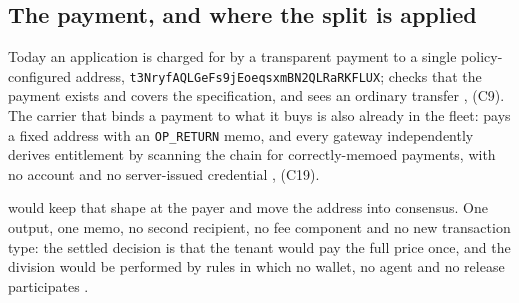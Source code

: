 \subsection{The payment, and where the split is applied}
\label{sec:pnr:tx}

Today an application is charged for by a transparent payment to a single policy-configured address,
\texttt{t3Nryf\allowbreak{}AQLGe\allowbreak{}Fs9j\allowbreak{}Eoeqsxm\allowbreak{}BN2QLRa\allowbreak{}RKFLUX}; \FluxOS checks that the payment exists and covers the
specification, and \fluxd sees an ordinary transfer \shipped
{},
 (C9). The carrier that binds a
payment to what it buys is also already in the fleet: \CumulusVPN pays a fixed address with an
\texttt{OP\_RETURN} memo, and every gateway independently derives entitlement by scanning the chain
for correctly-memoed payments, with no account and no server-issued credential \shipped
{},
 (C19).

\PNR would keep that shape at the payer and move the address into consensus. One output, one memo,
no second recipient, no fee component and no new transaction type: the settled decision is that the
tenant would pay the full price once, and the division would be performed by rules in which no
wallet, no agent and no \FluxOS release participates \planned
{} .

